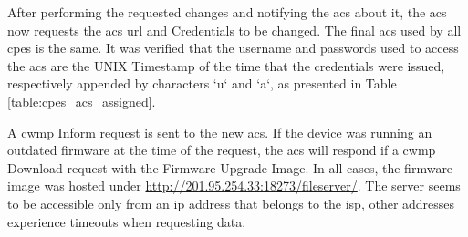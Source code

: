 \begin{table}[h]
    \caption{Connection Request Credentials of the \gls{cpe}s}
    \label{table:cpes_connreq}
\end{table}

After performing the requested changes and notifying the \gls{acs} about it, the \gls{acs} now requests the \gls{acs} \gls{url} and Credentials to be changed. The final \gls{acs} used by all \glspl{cpe} is the same. It was verified that the username and passwords used to access the \gls{acs} are the UNIX Timestamp of the time that the credentials were issued, respectively appended by characters `u` and `a`, as presented in Table \ref{table:cpes_acs_assigned}.

\begin{table}[h]
    \caption{Assigned \gls{acs} Credentials of the \gls{cpe}s}
    \label{table:cpes_acs_assigned}
\end{table}

A \gls{cwmp} Inform request is sent to the new \gls{acs}. If the device was running an outdated firmware at the time of the request, the \gls{acs} will respond if a \gls{cwmp} Download request with the Firmware Upgrade Image. In all cases, the firmware image was hosted under \url{http://201.95.254.33:18273/fileserver/}. The server seems to be accessible only from an \gls{ip} address that belongs to the \gls{isp}, other addresses experience timeouts when requesting data.

\FloatBarrier
